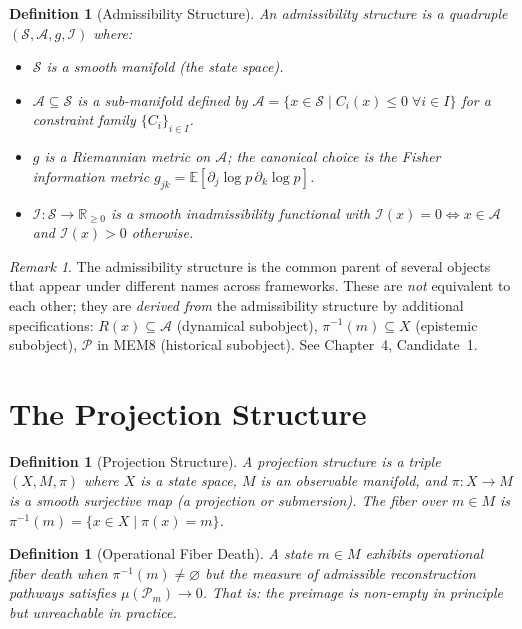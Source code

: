 \documentclass[11pt, a4paper]{book}
\theoremstyle{flyxion}
\newtheorem{definition}[theorem]{Definition}
\theoremstyle{remark}
\newtheorem{remark}[theorem]{Remark}
\begin{document}
\begin{definition}[Admissibility Structure]
An \emph{admissibility structure} is a quadruple
$(\mathcal{S}, \mathcal{A}, g, \mathcal{I})$ where:
\begin{itemize}
\item $\mathcal{S}$ is a smooth manifold (the state space).
\item $\mathcal{A} \subseteq \mathcal{S}$ is a sub-manifold defined
  by $\mathcal{A} = \{x \in \mathcal{S} \mid C_i(x) \leq 0\;\forall i
  \in I\}$ for a constraint family $\{C_i\}_{i \in I}$.
\item $g$ is a Riemannian metric on $\mathcal{A}$; the canonical
  choice is the Fisher information metric
  $g_{jk} = \mathbb{E}[\partial_j \log p\, \partial_k \log p]$.
\item $\mathcal{I}: \mathcal{S} \to \mathbb{R}_{\geq 0}$ is a
  smooth inadmissibility functional with $\mathcal{I}(x) = 0
  \iff x \in \mathcal{A}$ and $\mathcal{I}(x) > 0$ otherwise.
\end{itemize}
\end{definition}

\begin{remark}
The admissibility structure is the common parent of several objects
that appear under different names across frameworks. These are
\emph{not} equivalent to each other; they are \emph{derived from}
the admissibility structure by additional specifications:
$R(x) \subseteq \mathcal{A}$ (dynamical subobject),
$\pi^{-1}(m) \subseteq X$ (epistemic subobject),
$\mathcal{P}$ in MEM\textbar{}8 (historical subobject). See
Chapter~4, Candidate~1.
\end{remark}

\section{The Projection Structure}

\begin{definition}[Projection Structure]
A \emph{projection structure} is a triple $(X, M, \pi)$ where
$X$ is a state space, $M$ is an observable manifold, and
$\pi: X \to M$ is a smooth surjective map (a projection or
submersion). The \emph{fiber} over $m \in M$ is
$\pi^{-1}(m) = \{x \in X \mid \pi(x) = m\}$.
\end{definition}

\begin{definition}[Operational Fiber Death]
A state $m \in M$ exhibits \emph{operational fiber death} when
$\pi^{-1}(m) \neq \varnothing$ but the measure of admissible
reconstruction pathways satisfies $\mu(\mathcal{P}_m) \to 0$.
That is: the preimage is non-empty in principle but unreachable
in practice.
\end{definition}
\end{document}
